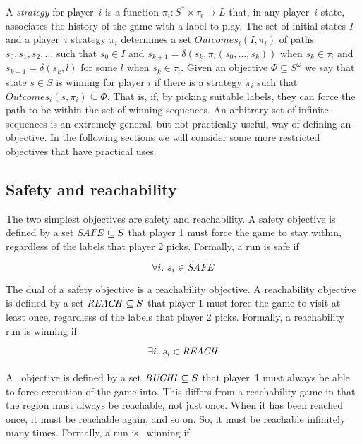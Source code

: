 A \emph{strategy} for player~$i$ is a function $\pi_i : S^* \times \tau_i \rightarrow L$ that, in any player~$i$ state, associates the history of the game with a label to play. The set of initial states $I$ and a player~$i$ strategy $\pi_i$ determines a set $Outcomes_i(I, \pi_i)$ of paths $s_0, s_1, s_2, \ldots $ such that $s_0 \in I$ and $s_{k+1} = \delta(s_k, \pi_i(s_0,\ldots,s_k))$ when $s_k \in \tau_i$ and $s_{k+1} = \delta(s_k, l)$ for some $l$ when $s_k \in \tau_{\overline{i}}$.  Given an objective $\Phi \subseteq S^\omega$ we say that state $s \in S$ is winning for player $i$ if there is a strategy $\pi_i$ such that $Outcomes_i({s}, \pi_i) \subseteq \Phi$. That is, if, by picking suitable labels, they can force the path to be within the set of winning sequences. An arbitrary set of infinite sequences is an extremely general, but not practically useful, way of defining an objective. In the following sections we will consider some more restricted objectives that have practical uses.

\subsection{Safety and reachability}
\label{sec:back_safety}

The two simplest objectives are safety and reachability. A safety objective is defined by a set $\mathit{SAFE} \subseteq S$ that player 1 must force the game to stay within, regardless of the labels that player 2 picks. Formally, a run is safe if 

\begin{equation}
\label{eqn:safeobj}
\forall i.\ s_i \in \mathit{SAFE}
\end{equation}

The dual of a safety objective is a reachability objective. A reachability objective is defined by a set $\mathit{REACH} \subseteq S$ that player 1 must force the game to visit at least once, regardless of the labels that player 2 picks. Formally, a reachability run is winning if 

\begin{equation}
\label{eqn:reachobj}
\exists i.\ s_i \in \mathit{REACH}
\end{equation}

\paragraph{\buchi}
\label{sec:buchi_def}
A \buchi\ objective is defined by a set $\mathit{BUCHI} \subseteq S$ that player~1 must always be able to force execution of the game into. This differs from a reachability game in that the region must always be reachable, not just once. When it has been reached once, it must be reachable again, and so on. So, it must be reachable infinitely many times. Formally, a run is \buchi\ winning if 

